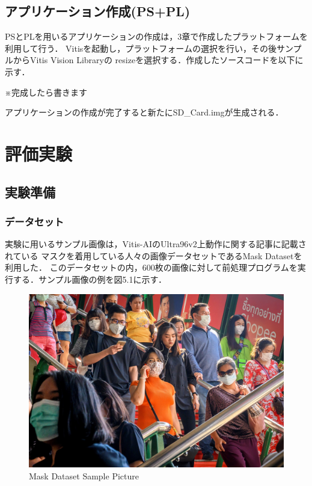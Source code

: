 \documentclass[11pt,a4j]{jreport}
\begin{document}
\section{アプリケーション作成(PS+PL)}
PSとPLを用いるアプリケーションの作成は，3章で作成したプラットフォームを利用して行う．
Vitisを起動し，プラットフォームの選択を行い，その後サンプルからVitis Vision Libraryの
resizeを選択する．作成したソースコードを以下に示す．

※完成したら書きます

%
%
%
アプリケーションの作成が完了すると新たにSD_Card.imgが生成される．
\chapter{評価実験}
\section{実験準備}
\subsection{データセット}
実験に用いるサンプル画像は，Vitis-AIのUltra96v2上動作に関する記事\cite{SamplePictWeb}に記載されている
マスクを着用している人々の画像データセットであるMask Dataset\cite{SamplePictDrive}を利用した．
このデータセットの内，600枚の画像に対して前処理プログラムを実行する．サンプル画像の例を図5.1に示す．
\begin{figure}[H]
  \center
  \includegraphics[scale = 0.17]{pict/Mask_1.jpg}
  \caption{Mask Dataset Sample Picture}
\end{figure}
\end{document}
